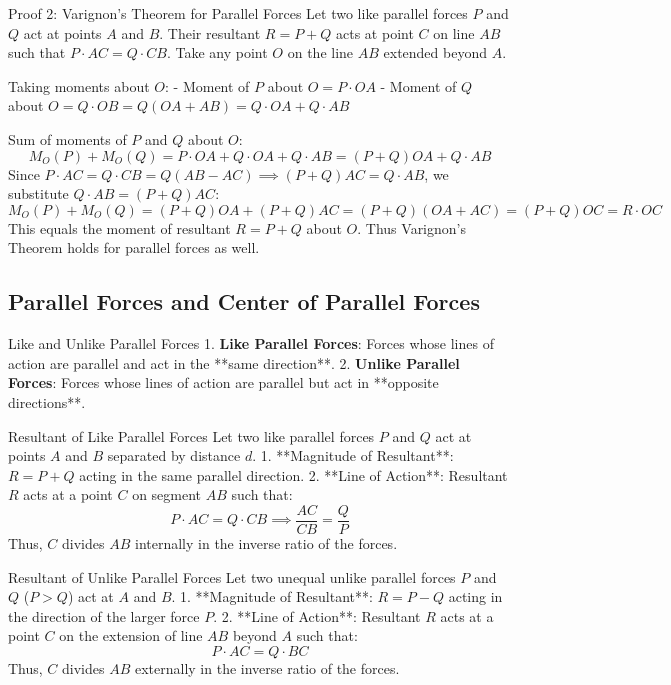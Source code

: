 \documentclass[11pt,a4paper]{article}
\begin{document}
\begin{proofbox}{Proof 2: Varignon's Theorem for Parallel Forces}
Let two like parallel forces $P$ and $Q$ act at points $A$ and $B$. Their resultant $R = P + Q$ acts at point $C$ on line $AB$ such that $P \cdot AC = Q \cdot CB$.
Take any point $O$ on the line $AB$ extended beyond $A$.

Taking moments about $O$:
- Moment of $P$ about $O = P \cdot OA$
- Moment of $Q$ about $O = Q \cdot OB = Q (OA + AB) = Q \cdot OA + Q \cdot AB$

Sum of moments of $P$ and $Q$ about $O$:
\[
M_O(P) + M_O(Q) = P \cdot OA + Q \cdot OA + Q \cdot AB = (P + Q) OA + Q \cdot AB
\]
Since $P \cdot AC = Q \cdot CB = Q (AB - AC) \implies (P+Q) AC = Q \cdot AB$, we substitute $Q \cdot AB = (P+Q) AC$:
\[
M_O(P) + M_O(Q) = (P + Q) OA + (P + Q) AC = (P + Q) (OA + AC) = (P + Q) OC = R \cdot OC
\]
This equals the moment of resultant $R = P + Q$ about $O$. Thus Varignon's Theorem holds for parallel forces as well.
\end{proofbox}

\subsection{Parallel Forces and Center of Parallel Forces}

\begin{definitionbox}{Like and Unlike Parallel Forces}
1. \textbf{Like Parallel Forces}: Forces whose lines of action are parallel and act in the **same direction**.
2. \textbf{Unlike Parallel Forces}: Forces whose lines of action are parallel but act in **opposite directions**.
\end{definitionbox}

\begin{proofbox}{Resultant of Like Parallel Forces}
Let two like parallel forces $P$ and $Q$ act at points $A$ and $B$ separated by distance $d$.
1. **Magnitude of Resultant**: $R = P + Q$ acting in the same parallel direction.
2. **Line of Action**: Resultant $R$ acts at a point $C$ on segment $AB$ such that:
\begin{equation}
P \cdot AC = Q \cdot CB \implies \frac{AC}{CB} = \frac{Q}{P}
\end{equation}
Thus, $C$ divides $AB$ internally in the inverse ratio of the forces.
\end{proofbox}

\begin{proofbox}{Resultant of Unlike Parallel Forces}
Let two unequal unlike parallel forces $P$ and $Q$ ($P > Q$) act at $A$ and $B$.
1. **Magnitude of Resultant**: $R = P - Q$ acting in the direction of the larger force $P$.
2. **Line of Action**: Resultant $R$ acts at a point $C$ on the extension of line $AB$ beyond $A$ such that:
\begin{equation}
P \cdot AC = Q \cdot BC
\end{equation}
Thus, $C$ divides $AB$ externally in the inverse ratio of the forces.
\end{proofbox}
\end{document}
